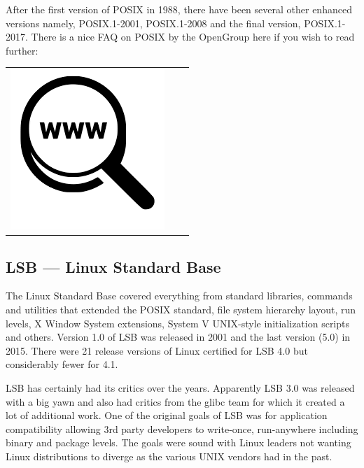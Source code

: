 \noindent
After the first version of POSIX in 1988, there have been several other enhanced versions namely, POSIX.1-2001, POSIX.1-2008 and the final version, POSIX.1-2017. There is a nice FAQ on POSIX by the OpenGroup here if you wish to read further:

\begin{table}[h]
\begin{tabular}{lcl}
\parbox[r]{0.5in}{ \includegraphics[scale=0.15]{figures/url.png}} & \parbox[l]{0.1in}{} & \parbox[l]{3in}{}
\end{tabular}
\end{table}

\subsection{LSB --- Linux Standard Base}

The Linux Standard Base covered everything from standard libraries, commands and utilities that extended the POSIX standard, file system hierarchy layout, run levels, X Window System extensions, System V UNIX-style initialization scripts and others. Version 1.0 of LSB was released in 2001 and the last version (5.0) in 2015. There were 21 release versions of Linux certified for LSB 4.0 but considerably fewer for 4.1.

LSB has certainly had its critics over the years. Apparently LSB 3.0 was released with a big yawn and also had critics from the glibc team for which it created a lot of additional work. One of the original goals of LSB was for application compatibility allowing 3rd party developers to write-once, run-anywhere including binary and package levels. The goals were sound with Linux leaders not wanting Linux distributions to diverge as the various UNIX vendors had in the past. 

